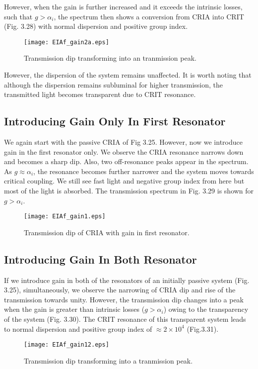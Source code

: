 However, when the gain is further increased and it exceeds the intrinsic losses, such that $g > \alpha_{i}$, the spectrum then shows a conversion from CRIA into CRIT (Fig. 3.28) with normal dispersion and positive group index.

\begin{figure}[h]
\centering
\texttt{[image: EIAf\_gain2a.eps]}
\caption{Transmission dip transforming into an tranmission peak.}
\end{figure}

However, the dispersion of the system remains unaffected. It is worth noting that although the dispersion remains subluminal for higher transmission, the transmitted light becomes transparent due to CRIT resonance.

\subsection{Introducing Gain Only In First Resonator}
We again start with the passive CRIA of Fig 3.25. However, now we introduce gain in the first resonator only. We observe the CRIA resonance narrows down and becomes a sharp dip. Also, two off-resonance peaks appear in the spectrum. As $g \approx \alpha_{i}$, the resonance becomes further narrower and the system moves towards critical coupling. We still see fast light and negative group index from here but most of the light is absorbed. The transmission spectrum in Fig. 3.29 is shown for $g > \alpha_{i}$.

\begin{figure}[h]
\centering
\texttt{[image: EIAf\_gain1.eps]}
\caption{Transmission dip of CRIA with gain in first resonator.}
\end{figure}

\subsection{Introducing Gain In Both Resonator}
If we introduce gain in both of the resonators of an initially passive system (Fig. 3.25), simultaneously, we observe the narrowing of CRIA dip and rise of the transmission towards unity. However, the transmission dip changes into a peak when the gain is greater than intrinsic losses ($g > \alpha_{i}$) owing to the transparency of the system (Fig. 3.30). The CRIT resonance of this transparent system leads to normal dispersion and positive group index of $\approx 2\times10^{4}$ (Fig.3.31).

\begin{figure}[h]
\centering
\texttt{[image: EIAf\_gain12.eps]}
\caption{Transmission dip transforming into a tranmission peak.}
\end{figure}

